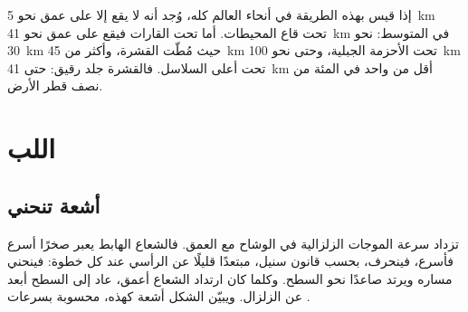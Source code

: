 إذا قيس  بهذه الطريقة في أنحاء العالم كله، وُجد أنه لا يقع إلا على عمق نحو
\qty{5}{km} تحت قاع المحيطات. أما تحت القارات فيقع على عمق نحو
\qty{41}{km} في المتوسط: نحو \qty{30}{km} حيث
مُطّت القشرة، وأكثر من \qty{45}{km} تحت الأحزمة الجبلية، وحتى نحو
\qty{100}{km} تحت أعلى السلاسل. فالقشرة جلد رقيق: حتى
\qty{41}{km} أقل من واحد في المئة من نصف قطر الأرض.

\section{اللب}

\subsection{أشعة تنحني}

تزداد سرعة الموجات الزلزالية في الوشاح مع العمق. فالشعاع
الهابط يعبر صخرًا أسرع فأسرع، فينحرف، بحسب قانون سنيل،
مبتعدًا قليلًا عن الرأسي عند كل خطوة: فينحني مساره ويرتد
صاعدًا نحو السطح. وكلما كان ارتداد الشعاع أعمق، عاد إلى السطح أبعد عن
الزلزال. ويبيّن الشكل أشعة كهذه، محسوبة بسرعات
.

